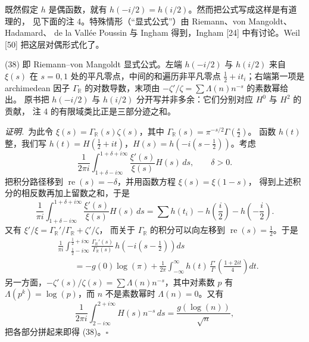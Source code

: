 \smallskip
既然假定 $h$ 是偶函数，就有 $h(-i/2)=h(i/2)$。然而把公式写成这样是有道理的，
见下面的注 4。特殊情形（“显式公式”）由 Riemann、von Mangoldt、Hadamard、
de la Vallée Poussin 与 Ingham 得到，Ingham [24] 中有讨论。Weil [50] 把这层对偶形式化了。

\begin{annote}
(38) 即 Riemann--von Mangoldt 显式公式。左端 $h(-i/2)$ 与 $h(i/2)$ 来自 $\xi(s)$ 在
$s=0,1$ 处的平凡零点，中间的和遍历非平凡零点 $\tfrac12+it_{i}$；右端第一项是 archimedean 因子
$\Gamma_{\mathbb{R}}$ 的对数导数，末项由 $-\zeta'/\zeta=\sum\Lambda(n)n^{-s}$ 的素数幂给出。
原书把 $h(-i/2)$ 与 $h(i/2)$ 分开写并非多余：它们分别对应 $H^{0}$ 与 $H^{2}$ 的贡献，
注 4 的有限域类比正是三部分迹之和。
\par{}
\end{annote}


\smallskip
\noindent\emph{证明.}\ 为此令 $\xi(s)=\Gamma_{\mathbb{R}}(s)\zeta(s)$，其中
$\Gamma_{\mathbb{R}}(s)=\pi^{-s/2}\Gamma\left(\frac{s}{2}\right)$。
函数 $h(t)$ 整，我们写 $h(t)=H\left(\frac12+it\right)$，$H(s)=h(-i(s-\frac12))$。考虑
\[
\frac{1}{2\pi i}\int_{1+\delta-i\infty}^{1+\delta+i\infty}\frac{\xi'(s)}{\xi(s)}H(s)\,ds,
\qquad\delta>0 .
\]
把积分路径移到 $\operatorname{re}(s)=-\delta$，并用函数方程 $\xi(s)=\xi(1-s)$，
得到上述积分的相反数再加上留数之和，于是
\[
\frac{1}{\pi i}\int_{1+\delta-i\infty}^{1+\delta+i\infty}\frac{\xi'(s)}{\xi(s)}H(s)\,ds
=\sum h(t_{i})-h\!\left(\frac{i}{2}\right)-h\!\left(-\frac{i}{2}\right).
\]
又有 $\xi'/\xi=\Gamma_{\mathbb{R}}'/\Gamma_{\mathbb{R}}+\zeta'/\zeta$，
而关于 $\Gamma_{\mathbb{R}}$ 的积分可以向左移到 $\operatorname{re}(s)=\tfrac12$。于是
\[
\begin{aligned}
&\frac{1}{\pi i}\int_{\frac12-i\infty}^{\frac12+i\infty}
\frac{\Gamma_{\mathbb{R}}'(s)}{\Gamma_{\mathbb{R}}(s)}\,h\!\left(-i\left(s-\frac12\right)\right)ds\\
&\qquad=-g(0)\log(\pi)+\frac{1}{2\pi}\int_{-\infty}^{\infty}h(t)\,
\frac{\Gamma'}{\Gamma}\!\left(\frac{1+2it}{4}\right)dt .
\end{aligned}
\]
另一方面，$-\zeta'(s)/\zeta(s)=\sum\Lambda(n)n^{-s}$，其中对素数 $p$ 有
$\Lambda(p^{k})=\log(p)$，而 $n$ 不是素数幂时 $\Lambda(n)=0$。又有
\[
\frac{1}{2\pi i}\int_{2-i\infty}^{2+i\infty}H(s)n^{-s}\,ds=\frac{g(\log(n))}{\sqrt{n}},
\]
把各部分拼起来即得 (38)。\hfill$\square$

